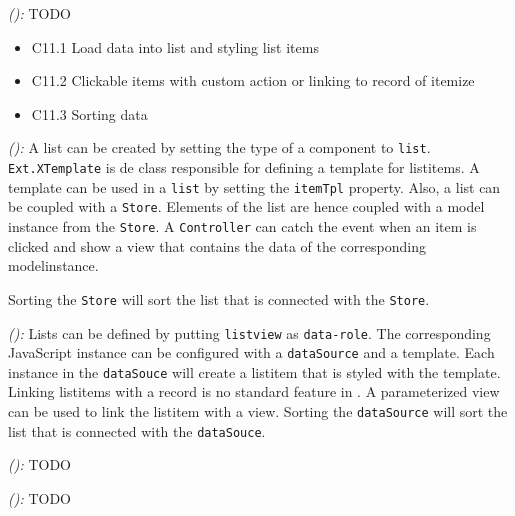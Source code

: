 \documentclass[a4paper]{artikel3}
\newcommand{\code}[1]{\texttt{#1}}
\newcommand{\setspace}[0]{\vspace{2mm}}
\renewcommand{\paragraph}[1]{\setspace \noindent {\bf #1}  }
\newcommand{\framework}[2]{ \emph{#1 (\textbf{#2}): }} %
\newcommand{\challenge}[1]{\paragraph{#1}}
\begin{document}
\framework{\lungoa{}}{}
TODO


\challenge{\chal{lijsten}}
\begin{itemize}
 \item C11.1 Load data into list and styling list items
 \item C11.2 Clickable items with custom action or linking to record of itemize
 \item C11.3 Sorting data
\end{itemize}


\framework{\sta{}}{}
A list can be created by setting the type of a component to \code{list}.
\code{Ext.XTemplate} is de \st{} class responsible for defining a template for listitems.
A template can be used in a \code{list} by setting the \code{itemTpl} property.
Also,  a list can be coupled with a \code{Store}.
Elements of the list are hence coupled with a model instance from the \code{Store}.
A \code{Controller} can catch the event when an item is clicked and show a view that contains the data of the corresponding modelinstance.

Sorting the \code{Store} will sort the list that is connected with the \code{Store}.

\framework{\kendoa{}}{}
Lists can be defined by putting \code{listview} as \code{data-role}.
The corresponding JavaScript instance can be configured with a \code{dataSource} and a template.
Each instance in the \code{dataSouce} will create a listitem that is styled with the template.
Linking listitems with a record is no standard feature in \kendo{}.
A parameterized view can be used to link the listitem with a view.
Sorting the \code{dataSource} will sort the list that is connected with the \code{dataSouce}.

\framework{\jqma{}}{}
TODO

\framework{\lungoa{}}{}
TODO

% 
% 
% 
% 
% 
% 
% 
\end{document}

